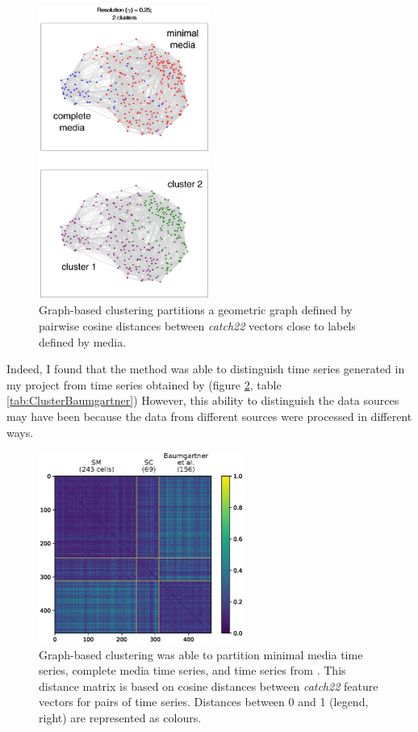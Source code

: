 \begin{figure}[htbp]
  \centering
  \includegraphics[width=0.5\textwidth]{10m_EffectofMediaClusters}
  \caption{Graph-based clustering partitions a geometric graph defined by pairwise cosine distances between \textit{catch22} vectors close to labels defined by media.}
  \label{fig:EffectofMediaClusters}
\end{figure}

Indeed, I found that the method was able to distinguish time series generated in my project from time series obtained by \textcite{baumgartnerFlavinbasedMetabolicCycles2018} (figure \ref{fig:DistanceMatrixBaumgartner}, table \ref{tab:ClusterBaumgartner})
However, this ability to distinguish the data sources may have been because the data from different sources were processed in different ways.

\begin{figure}[htbp]
  \centering
  \includegraphics[width=0.6\textwidth]{10m_DistanceMatrixBaumgartner}
  \caption{Graph-based clustering was able to partition minimal media time series, complete media time series, and time series from \textcite{baumgartnerFlavinbasedMetabolicCycles2018}.
    This distance matrix is based on cosine distances between \textit{catch22} feature vectors for pairs of time series.  Distances between 0 and 1 (legend, right) are represented as colours.}
  \label{fig:DistanceMatrixBaumgartner}
\end{figure}


